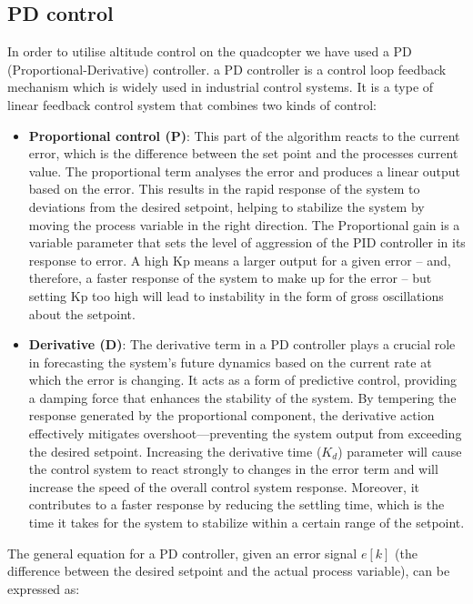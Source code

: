 \documentclass{report}
\begin{document}
\subsection{PD control}\label{PD_control} In order to utilise altitude
control on the quadcopter we have used a PD (Proportional-Derivative)
controller. a PD controller is a control loop feedback mechanism which is widely
used in industrial control systems. It is a type of linear feedback control
system that combines two kinds of control:
\begin{itemize}
  \item \textbf{Proportional control (P)}: This part of the algorithm reacts to
  the current error, which is the difference between the set point and the
  processes current value. The proportional term analyses the error and produces
  a linear output based on the error. This results in the rapid response of the
  system to deviations from the desired setpoint, helping to stabilize the
  system by moving the process variable in the right direction. The Proportional
  gain is a variable parameter that sets the level of aggression of the PID
  controller in its response to error. A high Kp means a larger output for
  a given error – and, therefore, a faster response of the system to make up for
  the error – but setting Kp too high will lead to instability in the form of
  gross oscillations about the setpoint.
  \item \textbf{Derivative (D)}: The derivative term in a PD controller plays a
  crucial role in forecasting the system's future dynamics based on the current
  rate at which the error is changing. It acts as a form of predictive control,
  providing a damping force that enhances the stability of the system. By
  tempering the response generated by the proportional component, the derivative
  action effectively mitigates overshoot—preventing the system output from
  exceeding the desired setpoint. Increasing the derivative time (\(K_d\)) parameter
  will cause the control system to react strongly to changes in the error term
  and will increase the speed of the overall control system response. Moreover,
  it contributes to a faster response by reducing the settling time, which is
  the time it takes for the system to stabilize within a certain range of the
  setpoint.
\end{itemize}
The general equation for a PD controller, given an error signal \(e[k]\) (the
difference between the desired setpoint and the actual process variable), can be
expressed as:
\end{document}
